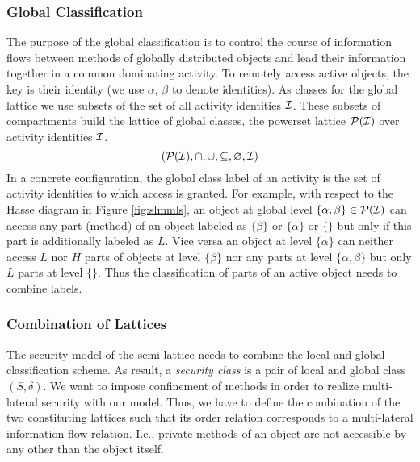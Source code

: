 \documentclass[10pt, conference, compsocconf]{IEEEtran}
\begin{document}
\subsubsection{Global Classification}
The purpose of the global classification is to control the course of information flows 
between methods of globally distributed objects and lead their information together in a common dominating activity.
To remotely access active objects, the key is their identity 
(we use $\alpha$, $\beta$ to denote identities). 
As classes for the global lattice we use subsets of the set of all 
activity identities ${\cal I}$. These subsets of compartments
build the lattice of global classes, the powerset lattice $\cal{P}(I)$ over activity identities ${\cal I}$.
\[ (\cal{P}(I), \cap, \cup, \subseteq, \varnothing, I) \]
In a concrete configuration, the global class label of an activity is the set of
activity identities to which access is granted. For example, with 
respect to the Hasse diagram in Figure \ref{fig:slmmls}, an object at global level 
$\{\alpha, \beta\} \in {\cal P(I)}$ can access any
part (method) of an object labeled as $\{\beta\}$ or $\{\alpha\}$ or $\{\}$ 
but only if this part is additionally labeled as $L$.
Vice versa an object at level $\{\alpha\}$ can neither access $L$ nor $H$ parts of objects at level
$\{\beta\}$ nor any parts at level $\{\alpha, \beta\}$ but only $L$ parts at level $\{\}$. Thus the
classification of parts of an active object needs to combine labels.

\subsubsection{Combination of Lattices}
\label{sec:comblatt}
The security model of the semi-lattice needs to combine the local and global classification scheme.
As result, a {\it security class} is a pair of local and global class $(S, \delta)$.
We want to impose confinement of methods in order to realize multi-lateral security with 
our model. Thus, we have to define the combination of the two constituting lattices such that its
order relation corresponds to a multi-lateral information flow relation. I.e., private methods 
of an object are not accessible by any other than the object itself.
\end{document}
